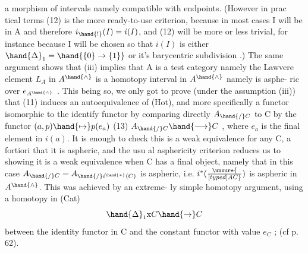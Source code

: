 
a morphism of intervals\hand{,} namely compatible with endpoints. (However in prac\unsure{-}%
tical terms (12) is the more ready-to-use criterion,  because in most
cases I will be in A and therefore  $i_{\hand{!}}(I) = i(I)$,  and (12) will be more
or less trivial,  for instance because I will be chosen so that $i(I)$ is
either $\hand{\Delta}_1 = \hand{\{0\}\to\{1\}}$  or it's barycentric subdivision .)  The
same argument shows that (iii) implies that A is a test category\hand{,} namely
the Lawvere element $L_A$ in $A^{\hand{\wedge}}$ is a homotopy interval in $A^{\hand{\wedge}}$\hand{,} namely is asphe-%
ric over $e_{A^{\hand{\wedge}}}$ .  This being so,  we  only got to
prove (under the assumption (iii))  that  (11) induces an autoequivalence
of (Hot),  and more specifically a functor isomorphic to the identify
functor  by comparing directly $A_{\hand{/}C}$ to C  by the functor  $(a,p)\hand{\mapsto} p(e_a)$
(13) \qquad $A_{\hand{/}C} \hand{\longrightarrow} C$ ,
where  $e_a$ is the final element in $i(a)$.  It is enough to check this is a
weak equivalence for any C,  a fortiori that it is aspheric,  and the usu%
al asphericity criterion reduces us to showing it is a weak equivalence
when C has a final object,  namely that in this case  $A_{\hand{/}C} = A_{\hand{/}i^{\hand{*}}(C)}$  is
aspheric,  i.e. $i^*(\unsure{\over[typed]{A}{C}})$ is aspheric in $A^{\hand{\wedge}}$.  This was achieved by an extreme-%
ly simple homotopy argument,  using a homotopy  in (Cat)
\[ \hand{\Delta}_1 \mathrm{x} C \hand{\to} C \]
between the identity functor in C and the constant functor with value $e_C$ ;
(cf p. 62).

